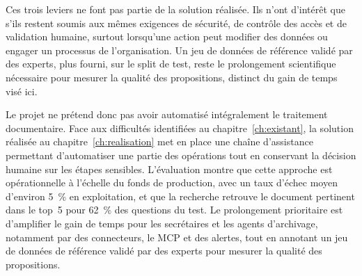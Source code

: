 Ces trois leviers ne font pas partie de la solution réalisée. Ils n'ont d'intérêt que s'ils restent soumis aux mêmes exigences de sécurité, de contrôle des accès et de validation humaine, surtout lorsqu'une action peut modifier des données ou engager un processus de l'organisation. Un jeu de données de référence validé par des experts, plus fourni, sur le split de test, reste le prolongement scientifique nécessaire pour mesurer la qualité des propositions, distinct du gain de temps visé ici.

Le projet ne prétend donc pas avoir automatisé intégralement le traitement documentaire. Face aux difficultés identifiées au chapitre~\ref{ch:existant}, la solution réalisée au chapitre~\ref{ch:realisation} met en place une chaîne d'assistance permettant d'automatiser une partie des opérations tout en conservant la décision humaine sur les étapes sensibles. L'évaluation montre que cette approche est opérationnelle à l'échelle du fonds de production, avec un taux d'échec moyen d'environ 5~\% en exploitation, et que la recherche retrouve le document pertinent dans le top~5 pour 62~\% des questions du test. Le prolongement prioritaire est d'amplifier le gain de temps pour les secrétaires et les agents d'archivage, notamment par des connecteurs, le MCP et des alertes, tout en annotant un jeu de données de référence validé par des experts pour mesurer la qualité des propositions.
